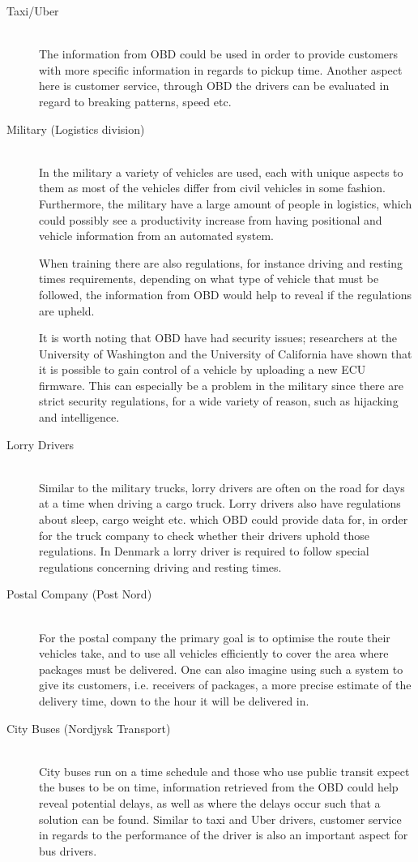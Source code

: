 \begin{description}
    \item [Taxi/Uber] \hfill \\
    The information from \ac{OBD} could be used in order to provide customers with more specific information in regards to pickup time.
    Another aspect here is customer service, through \ac{OBD} the drivers can be evaluated in regard to breaking patterns, speed etc.
    \item [Military (Logistics division)] \hfill \\
    In the military a variety of vehicles are used, each with unique aspects to them as most of the vehicles differ from civil vehicles in some fashion.
    Furthermore, the military have a large amount of people in logistics, which could possibly see a productivity increase from having positional and vehicle information from an automated system.

    When training there are also regulations, for instance driving and resting times requirements, depending on what type of vehicle that must be followed, the information from \ac{OBD} would help to reveal if the regulations are upheld.

    It is worth noting that \ac{OBD} have had security issues; researchers at the University of Washington and the University of California have shown that it is possible to gain control of a vehicle by uploading a new \ac{ECU} firmware\cite{OBDSecurity}.
    This can especially be a problem in the military since there are strict security regulations, for a wide variety of reason, such as hijacking and intelligence. 
    \item [Lorry Drivers] \hfill \\
    Similar to the military trucks, lorry drivers are often on the road for days at a time when driving a cargo truck.
    Lorry drivers also have regulations about sleep, cargo weight etc. which \ac{OBD} could provide data for, in order for the truck company to check whether their drivers uphold those regulations.
    In Denmark a lorry driver is required to follow special regulations concerning driving and resting times\cite{haulierSleepLaw}.
    \item [Postal Company (Post Nord)] \hfill \\
    For the postal company the primary goal is to optimise the route their vehicles take, and to use all vehicles efficiently to cover the area where packages must be delivered.
    One can also imagine using such a system to give its customers, i.e. receivers of packages, a more precise estimate of the delivery time, down to the hour it will be delivered in.
    \item [City Buses (Nordjysk Transport)] \hfill \\
    City buses run on a time schedule and those who use public transit expect the buses to be on time, information retrieved from the \ac{OBD} could help reveal potential delays, as well as where the delays occur such that a solution can be found.
    Similar to taxi and Uber drivers, customer service in regards to the performance of the driver is also an important aspect for bus drivers.
\end{description}

